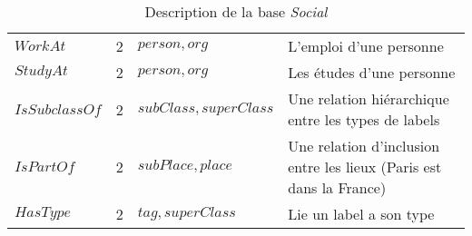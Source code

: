 \begin{table}[H]
\begin{adjustbox}{max width=\linewidth}
\begin{tabular}{l|c|l|l}
            $WorkAt$ & 2 & $person, org$ & L'emploi d'une personne \\
            $StudyAt$ & 2 & $person, org$ & Les études d'une personne \\
            $IsSubclassOf$ & 2 & $subClass, superClass$ & Une relation hiérarchique entre les types de labels \\
            $IsPartOf$ & 2 & $subPlace, place$ & Une relation d'inclusion entre les lieux (Paris est dans la France) \\
            $HasType$ & 2 & $tag, superClass$ & Lie un label a son type \\
        \end{tabular}
    \end{adjustbox}
    \caption{Description de la base \textit{Social}}
\end{table}

